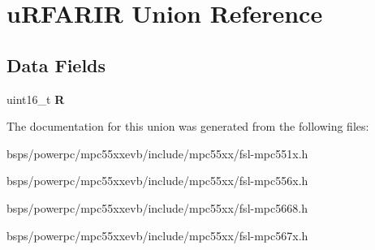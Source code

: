 \hypertarget{unionuRFARIR}{}\section{u\+R\+F\+A\+R\+IR Union Reference}
\label{unionuRFARIR}
\subsection*{Data Fields}
\begin{DoxyCompactItemize}
\item 
\mbox{\label{unionuRFARIR_a481aed9f254a9e6b26e116e276a29a6b}} 
uint16\+\_\+t {\bfseries R}
\end{DoxyCompactItemize}


The documentation for this union was generated from the following files\+:\begin{DoxyCompactItemize}
\item 
bsps/powerpc/mpc55xxevb/include/mpc55xx/fsl-\/mpc551x.\+h\item 
bsps/powerpc/mpc55xxevb/include/mpc55xx/fsl-\/mpc556x.\+h\item 
bsps/powerpc/mpc55xxevb/include/mpc55xx/fsl-\/mpc5668.\+h\item 
bsps/powerpc/mpc55xxevb/include/mpc55xx/fsl-\/mpc567x.\+h\end{DoxyCompactItemize}
